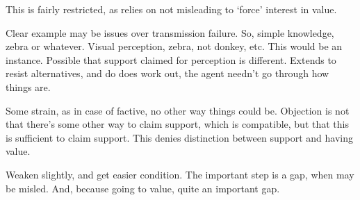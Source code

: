 \begin{note}[Explanation of \nI{}]
  This is fairly restricted, as relies on not misleading to `force' interest in value.

  Clear example may be issues over transmission failure.
  So, simple knowledge, zebra or whatever.
  Visual perception, zebra, not donkey, etc.
  This would be an instance.
  Possible that support claimed for perception is different.
  Extends to resist alternatives, and do does work out, the agent needn't go through how things are.

  Some strain, as in case of factive, no other way things could be.
  Objection is not that there's some other way to claim support, which is compatible, but that this is sufficient to claim support.
  This denies distinction between support and having value.

  Weaken slightly, and get easier condition.
  The important step is a gap, when may be misled.
  And, because going to value, quite an important gap.
\end{note}




